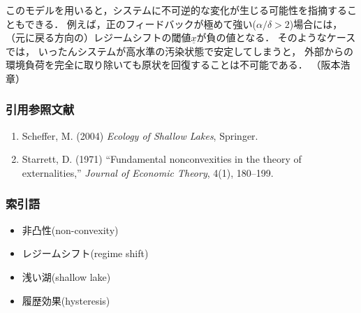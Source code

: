 \documentclass[11pt,a4paper]{article}
\begin{document}
このモデルを用いると，システムに不可逆的な変化が生じる可能性を指摘することもできる．
例えば，正のフィードバックが極めて強い($\alpha/\delta > 2$)場合には，
（元に戻る方向の）レジームシフトの閾値$\underline{x}$が負の値となる．
そのようなケースでは，
いったんシステムが高水準の汚染状態で安定してしまうと，
外部からの環境負荷を完全に取り除いても原状を回復することは不可能である．
（阪本浩章）

\clearpage

\subsubsection*{引用参照文献}

\begin{enumerate}
  \item Scheffer, M. (2004) \emph{Ecology of Shallow Lakes}, Springer.
  \item Starrett, D. (1971) ``Fundamental nonconvexities in the theory of externalities,''
    \textit{Journal of Economic Theory}, 4(1), 180--199.
\end{enumerate}

\subsubsection*{索引語}

\begin{itemize}
  \item 非凸性(non-convexity)
  \item レジームシフト(regime shift)
  \item 浅い湖(shallow lake)
  \item 履歴効果(hysteresis)
\end{itemize}
\end{document}
